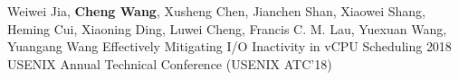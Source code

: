 \cvpub
{Weiwei Jia, \textbf{Cheng Wang}, Xusheng Chen, Jianchen Shan, Xiaowei Shang, Heming Cui, Xiaoning Ding, Luwei Cheng, Francis C. M. Lau, Yuexuan Wang, Yuangang Wang} %
{Effectively Mitigating I/O Inactivity in vCPU Scheduling} %
{} %
{} %
{ %
2018 USENIX Annual Technical Conference (USENIX ATC'18) \newline
}
